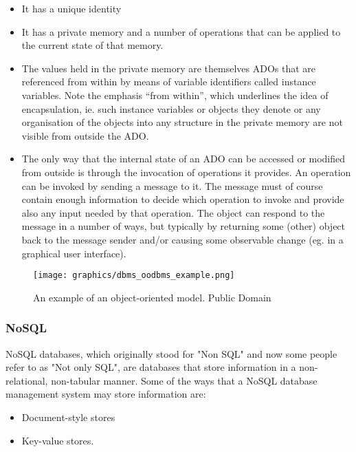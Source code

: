 \documentclass[letterpaper, 11pt]{article}
\begin{document}
\begin{itemize}
  \item It has a unique identity
  \item It has a private memory and a number of operations that can be applied to the current state of that memory.
  \item The values held in the private memory are themselves ADOs that are referenced from
within by means of variable identifiers called instance variables. Note the emphasis
“from within”, which underlines the idea of encapsulation, ie. such instance variables
or objects they denote or any organisation of the objects into any structure in the
private memory are not visible from outside the ADO.
  \item The only way that the internal state of an ADO can be accessed or modified from
outside is through the invocation of operations it provides. An operation can be
invoked by sending a message to it. The message must of course contain enough
information to decide which operation to invoke and provide also any input needed
by that operation. The object can respond to the message in a number of ways, but
typically by returning some (other) object back to the message sender and/or causing
some observable change (eg. in a graphical user interface).
\end{itemize} \cite{object_oriented_data_model}
\par\vspace{\baselineskip}
\begin{figure}
  \centering
  \texttt{[image: graphics/dbms\_oodbms\_example.png]}
  \caption{An example of an object-oriented model. Public Domain \cite{wikiObjectOrientedDBMS}}
  \label{fig:ooDBMS_structure}
\end{figure}

\subsubsection{NoSQL}
NoSQL databases, which originally stood for "Non SQL" and now some people refer to as
"Not only SQL", are databases that store information in a non-relational, non-tabular
manner. Some of the ways that a NoSQL database management system may store information are:

\begin{itemize}
  \item Document-style stores
  \item Key-value stores.
\end{itemize}
\end{document}
